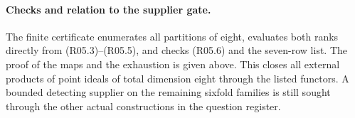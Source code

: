\paragraph{Checks and relation to the supplier gate.}
The finite certificate enumerates all partitions of eight, evaluates
both ranks directly from (R05.3)--(R05.5), and checks (R05.6) and the
seven-row list. The proof of the maps and the exhaustion is given
above. This closes all external products of point ideals of total
dimension eight through the listed functors. A bounded detecting
supplier on the remaining sixfold families is still sought through
the other actual constructions in the question register.

